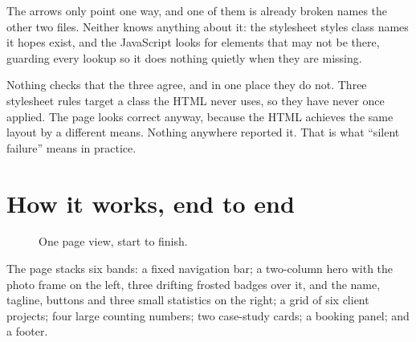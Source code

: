 \documentclass[11pt,a4paper]{article}
\begin{document}
\begin{keyidea}{The arrows only point one way, and one of them is already broken}
 names the other two files. Neither knows anything about it: the
stylesheet styles class names it hopes exist, and the JavaScript looks for elements
that may not be there, guarding every lookup so it does nothing quietly when they
are missing.

Nothing checks that the three agree, and in one place they do not. Three stylesheet
rules target a class the HTML never uses, so they have never once applied. The page
looks correct anyway, because the HTML achieves the same layout by a different
means. Nothing anywhere reported it. That is what ``silent failure'' means in
practice.
\end{keyidea}

\section{How it works, end to end}

\begin{figure}[H]\centering
{}
\caption{One page view, start to finish.}
\end{figure}

The page stacks six bands: a fixed navigation bar; a two-column hero with the photo
frame on the left, three drifting frosted badges over it, and the name, tagline,
buttons and three small statistics on the right; a grid of six client projects;
four large counting numbers; two case-study cards; a booking panel; and a footer.
\end{document}
